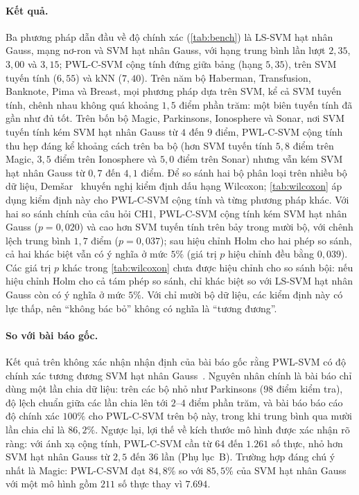 \paragraph{Kết quả.} Ba phương pháp dẫn đầu về độ chính xác (\cref{tab:bench}) là LS-SVM hạt nhân Gauss, mạng nơ-ron và SVM hạt nhân Gauss, với hạng trung bình lần lượt $2{,}35$, $3{,}00$ và $3{,}15$; PWL-C-SVM cộng tính đứng giữa bảng (hạng $5{,}35$), trên SVM tuyến tính ($6{,}55$) và kNN ($7{,}40$). Trên năm bộ Haberman, Transfusion, Banknote, Pima và Breast, mọi phương pháp dựa trên SVM, kể cả SVM tuyến tính, chênh nhau không quá khoảng $1{,}5$ điểm phần trăm: một biên tuyến tính đã gần như đủ tốt. Trên bốn bộ Magic, Parkinsons, Ionosphere và Sonar, nơi SVM tuyến tính kém SVM hạt nhân Gauss từ $4$ đến $9$ điểm, PWL-C-SVM cộng tính thu hẹp đáng kể khoảng cách trên ba bộ (hơn SVM tuyến tính $5{,}8$ điểm trên Magic, $3{,}5$ điểm trên Ionosphere và $5{,}0$ điểm trên Sonar) nhưng vẫn kém SVM hạt nhân Gauss từ $0{,}7$ đến $4{,}1$ điểm. Để so sánh hai bộ phân loại trên nhiều bộ dữ liệu, Demšar~\cite{demsar2006} khuyến nghị kiểm định dấu hạng Wilcoxon; \cref{tab:wilcoxon} áp dụng kiểm định này cho PWL-C-SVM cộng tính và từng phương pháp khác. Với hai so sánh chính của câu hỏi CH1, PWL-C-SVM cộng tính kém SVM hạt nhân Gauss ($p=0{,}020$) và cao hơn SVM tuyến tính trên bảy trong mười bộ, với chênh lệch trung bình $1{,}7$ điểm ($p=0{,}037$); sau hiệu chỉnh Holm cho hai phép so sánh, cả hai khác biệt vẫn có ý nghĩa ở mức $5\%$ (giá trị $p$ hiệu chỉnh đều bằng $0{,}039$). Các giá trị $p$ khác trong \cref{tab:wilcoxon} chưa được hiệu chỉnh cho so sánh bội: nếu hiệu chỉnh Holm cho cả tám phép so sánh, chỉ khác biệt so với LS-SVM hạt nhân Gauss còn có ý nghĩa ở mức $5\%$. Với chỉ mười bộ dữ liệu, các kiểm định này có lực thấp, nên “không bác bỏ” không có nghĩa là “tương đương”.

\paragraph{So với bài báo gốc.} Kết quả trên không xác nhận nhận định của bài báo gốc rằng PWL-SVM có độ chính xác tương đương SVM hạt nhân Gauss~\cite{huang2013}. Nguyên nhân chính là bài báo chỉ dùng một lần chia dữ liệu: trên các bộ nhỏ như Parkinsons ($98$ điểm kiểm tra), độ lệch chuẩn giữa các lần chia lên tới $2$--$4$ điểm phần trăm, và bài báo báo cáo độ chính xác $100\%$ cho PWL-C-SVM trên bộ này, trong khi trung bình qua mười lần chia chỉ là $86{,}2\%$. Ngược lại, lợi thế về kích thước mô hình được xác nhận rõ ràng: với ánh xạ cộng tính, PWL-C-SVM cần từ $64$ đến $1.261$ số thực, nhỏ hơn SVM hạt nhân Gauss từ $2{,}5$ đến $36$ lần (Phụ lục~B). Trường hợp đáng chú ý nhất là Magic: PWL-C-SVM đạt $84{,}8\%$ so với $85{,}5\%$ của SVM hạt nhân Gauss với một mô hình gồm $211$ số thực thay vì $7.694$.

